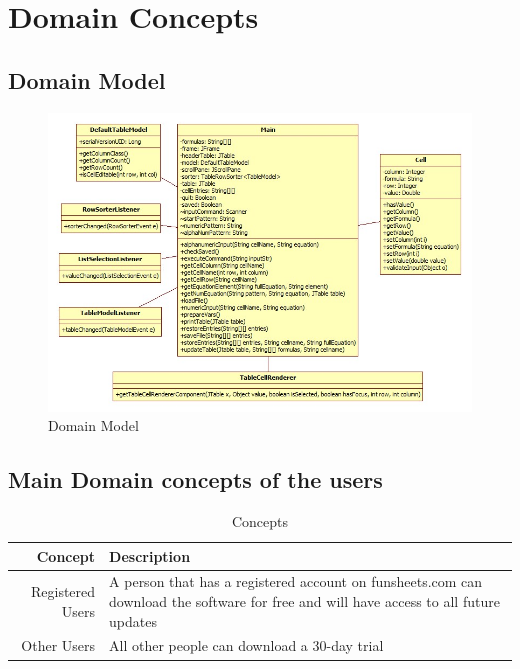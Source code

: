 \documentclass[12pt]{article}
\begin{document}
\clearpage
\section{Domain Concepts}
\subsection{Domain Model}

\begin{figure}[htbp]
\includegraphics[scale=.6]{DomainModel.jpg}
\caption{Domain Model}
\label{fig:Domain-model-diagram}
\end{figure}

\clearpage

\subsection{Main Domain concepts of the users}
\begin{table}[htbp]
\caption{Concepts}
\begin{center}
\begin{tabular}{|r | p{10cm}|}
\hline
Concept & Description \\\hline\hline
Registered Users & A person that has a registered account on funsheets.com can download the software for free and will have access to all future updates \\\hline\hline
Other Users & All other people can download a 30-day trial\\\hline
\end{tabular}
\end{center}
\end{table}
\end{document}
